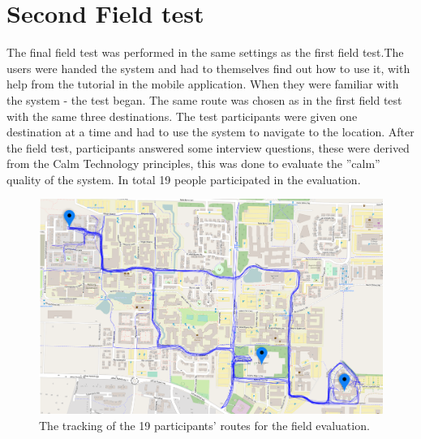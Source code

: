 \documentclass{sigchi}
\begin{document}
\section{Second Field test}
The final field test was performed in the same settings as the first field test.The users were handed the system and had to themselves find out how to use it, with help from the tutorial in the mobile application. When they were familiar with the system - the test began. The same route was chosen as in the first field test with the same three destinations. 
\newline
\newline
The test participants were given one destination at a time and had to use the system to navigate to the location. After the field test, participants answered some interview questions, these were derived from the Calm Technology principles, this was done to evaluate the ''calm'' quality of the system. In total 19 people participated in the evaluation.
\begin{figure}[!b]
  \centering
  \includegraphics[width=1.02\columnwidth]{figures/stort_heat_map.png}
  \caption{The tracking of the 19 participants' routes for the field evaluation.}
  \label{fig:stort_heat_map}
\end{figure}
\end{document}
